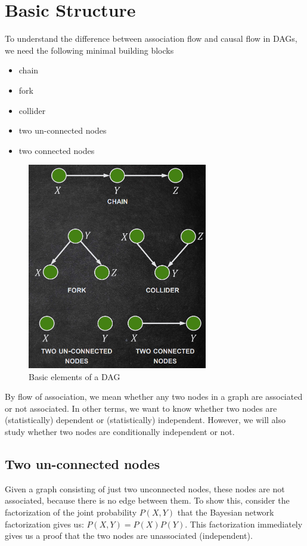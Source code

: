 \section{Basic Structure}
To understand the difference between association flow and causal flow in DAGs,
we need the following minimal building blocks
\begin{itemize}
    \item chain
    \item fork
    \item collider
    \item two un-connected nodes
    \item two connected nodes
\end{itemize}
\begin{figure}[!ht]
    \centering
    \includegraphics[width=0.7\textwidth]{img/basic_bn.png}
    \caption{Basic elements of a DAG}
\end{figure}

By flow of association, we mean whether any two nodes in a graph are associated
or not associated. In other terms, we want to know whether two nodes are
(statistically) dependent or (statistically) independent. However, we will also
study whether two nodes are conditionally independent or not.
\subsection{Two un-connected nodes}
Given a graph consisting of just two unconnected nodes, these nodes are not
associated, because there is no edge between them. To show this, consider the
factorization of the joint probability $P(X, Y)$ that the Bayesian network
factorization gives us: $P(X, Y) = P(X)P(Y)$. This factorization immediately
gives us a proof that the two nodes are unassociated (independent).
